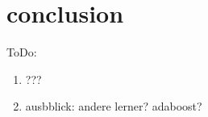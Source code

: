 
\chapter{conclusion}\label{conclusion}
ToDo:
\begin{enumerate}[nosep]
    \item ???
    \item ausbblick: andere lerner? adaboost?
\end{enumerate}
